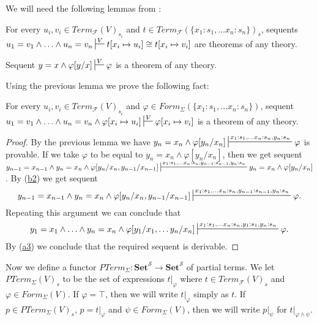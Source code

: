 \documentclass[reqno]{amsart}
\newcommand{\axref}[1]{(\hyperref[ax:#1]{#1})}
\theoremstyle{definition}
\theoremstyle{remark}
\newcommand{\cat}[1]{\mathbf{#1}}
\newcommand{\Set}{\cat{Set}}
\numberwithin{figure}{section}
\begin{document}
We will need the following lemmas from \cite{PHL}:
\begin{lem}[cong-a]
For every $u_i,v_i \in Term_\mathcal{F}(V)_{s_i}$ and $t \in Term_\mathcal{F}(\{ x_1 : s_1, \ldots x_n : s_n\})_s$,
sequents $u_1 = v_1 \land \ldots \land u_n = v_n \sststile{}{V} t[x_i \mapsto u_i] \cong t[x_i \mapsto v_i]$ are theorems of any theory.
\end{lem}

\begin{lem}
Sequent $y = x \land \varphi[y/x] \sststile{}{V} \varphi$ is a theorem of any theory.
\end{lem}

Using the previous lemma we prove the following fact:

\begin{lem}[cong-b]
For every $u_i,v_i \in Term_\mathcal{F}(V)_{s_i}$ and $\varphi \in Form_\Sigma(\{ x_1 : s_1, \ldots x_n : s_n\})$,
sequent $u_1 = v_1 \land \ldots \land u_n = v_n \land \varphi[x_i \mapsto u_i] \sststile{}{V} \varphi[x_i \mapsto v_i]$ is a theorem of any theory.
\end{lem}
\begin{proof}
By the previous lemma we have $y_n = x_n \land \varphi[y_n/x_n] \sststile{}{x_1 : s_1, \ldots x_n : s_n, y_n : s_n} \varphi$ is provable.
If we take $\varphi$ to be equal to $y_n = x_n \land \varphi[y_n/x_n]$, then we get sequent
$y_{n-1} = x_{n-1} \land y_n = x_n \land \varphi[y_n/x_n,y_{n-1}/x_{n-1}] \sststile{}{x_1 : s_1, \ldots x_n : s_n, y_{n-1} : s_{n-1}, y_n : s_n} y_n = x_n \land \varphi[y_n/x_n]$.
By \axref{b2} we get sequent
\[ y_{n-1} = x_{n-1} \land y_n = x_n \land \varphi[y_n/x_n,y_{n-1}/x_{n-1}] \sststile{}{x_1 : s_1, \ldots x_n : s_n, y_{n-1} : s_{n-1}, y_n : s_n} \varphi. \]
Repeating this argument we can conclude that
\[ y_1 = x_1 \land \ldots \land y_n = x_n \land \varphi[y_1/x_1, \ldots y_n/x_n] \sststile{}{x_1 : s_1, \ldots x_n : s_n, y_1 : s_1, y_n : s_n} \varphi. \]
By \axref{a3} we conclude that the required sequent is derivable.
\end{proof}

Now we define a functor $PTerm_\Sigma : \Set^\mathcal{S} \to \Set^\mathcal{S}$ of partial terms.
We let $PTerm_\Sigma(V)_s$ to be the set of expressions $t|_\varphi$ where $t \in Term_\mathcal{F}(V)_s$ and $\varphi \in Form_\Sigma(V)$.
If $\varphi = \top$, then we will write $t|_\varphi$ simply as $t$.
If $p \in PTerm_\Sigma(V)_s$, $p = t|_\varphi$ and $\psi \in Form_\Sigma(V)$, then we will write $p|_\psi$ for $t|_{\varphi \land \psi}$.
\end{document}
